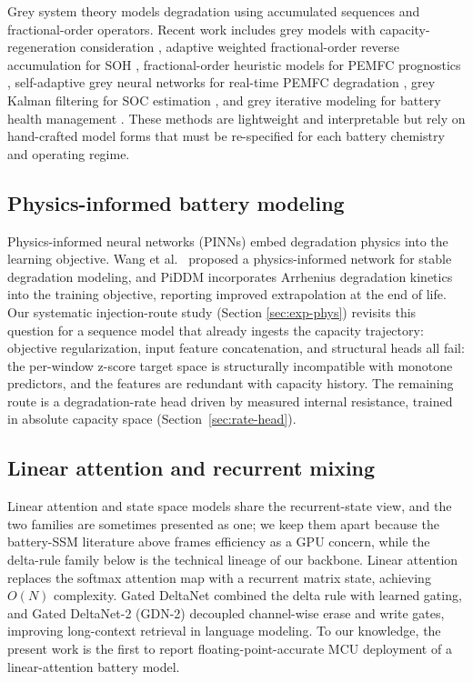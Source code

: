 \documentclass[final,5p,times,twocolumn]{elsarticle}
\begin{document}
Grey system theory models degradation using accumulated sequences and
fractional-order operators. Recent work includes grey models with
capacity-regeneration consideration \cite{ref_grey_hybrid}, adaptive
weighted fractional-order reverse accumulation for SOH
\cite{ref_grey_frac}, fractional-order heuristic models for PEMFC
prognostics \cite{ref_grey_pemfc}, self-adaptive grey neural networks
for real-time PEMFC degradation \cite{ref_grey_nn}, grey Kalman
filtering for SOC estimation \cite{ref_grey_kalman}, and grey
iterative modeling for battery health management \cite{ref_grey_iter}.
These methods are lightweight and interpretable but rely on
hand-crafted model forms that must be re-specified for each battery
chemistry and operating regime.

\subsection{Physics-informed battery modeling}

Physics-informed neural networks (PINNs) embed degradation physics
into the learning objective. Wang et al.\ \cite{ref_wang_pinn}
proposed a physics-informed network for stable degradation modeling,
and PiDDM \cite{ref_piddm} incorporates Arrhenius degradation kinetics
into the training objective, reporting improved extrapolation at the
end of life. Our systematic injection-route study (Section
\ref{sec:exp-phys}) revisits this question for a sequence model that
already ingests the capacity trajectory: objective regularization,
input feature concatenation, and structural heads all fail: the
per-window z-score target space is structurally incompatible with
monotone predictors, and the features are redundant with capacity
history. The remaining route is a degradation-rate head driven by
measured internal resistance, trained in absolute capacity space
(Section~\ref{sec:rate-head}).

\subsection{Linear attention and recurrent mixing}

Linear attention and state space models share the recurrent-state
view, and the two families are sometimes presented as one; we keep
them apart because the battery-SSM literature above frames
efficiency as a GPU concern, while the delta-rule family below is
the technical lineage of our backbone. Linear attention replaces the softmax attention map with a recurrent
matrix state, achieving $O(N)$ complexity. Gated DeltaNet
\cite{ref_gdn} combined the delta rule with learned gating, and
Gated DeltaNet-2 (GDN-2) \cite{ref_gdn2} decoupled channel-wise erase
and write gates, improving long-context retrieval in language
modeling. To our knowledge, the present work is the first to report
floating-point-accurate MCU deployment of a linear-attention battery model.
\end{document}
